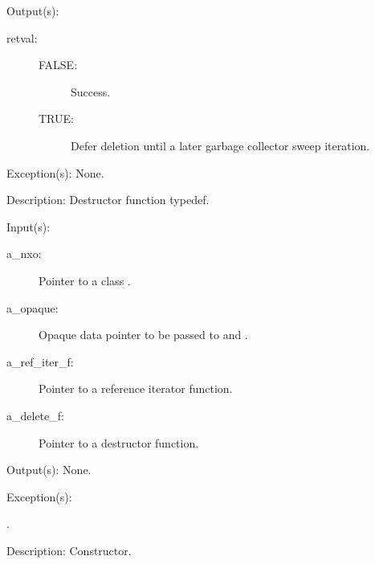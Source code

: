 \begin{capi}
\begin{capilist}
\begin{description}
		\end{description}
	\item[Output(s): ]
		\begin{description}\item[]
		\item[retval: ]
			\begin{description}\item[]
			\item[FALSE: ] Success.
			\item[TRUE: ] Defer deletion until a later garbage
			collector sweep iteration.
			\end{description}
		\end{description}
	\item[Exception(s): ] None.
	\item[Description: ]
		Destructor function typedef.
	\end{capilist}
\label{nxo_class_new}
	\begin{capilist}
	\item[Input(s): ]
		\begin{description}\item[]
		\item[a\_nxo: ]
			Pointer to a class .
		\item[a\_opaque: ]
			Opaque data pointer to be passed to
			 and .
		\item[a\_ref\_iter\_f: ]
			Pointer to a reference iterator function.
		\item[a\_delete\_f: ]
			Pointer to a destructor function.
		\end{description}
	\item[Output(s): ] None.
	\item[Exception(s): ]
		\begin{description}\item[]
		\item[.]
		\end{description}
	\item[Description: ]
		Constructor.
	\end{capilist}
\label{nxo_class_super_get}
	\begin{capilist}

\end{capilist}
\end{capi}
